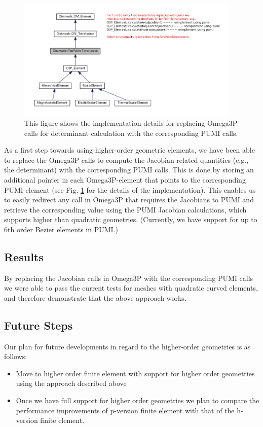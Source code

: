 \documentclass[review,12pt]{elsarticle_summary_report}
\begin{document}
\begin{figure}[!ph]
\centering
\includegraphics[width=0.95\textwidth]{hide_ten_point_tet.png}
\caption{\label{imp} This figure shows the implementation details for replacing Omega3P calls for determinant calculation with the corresponding PUMI calls.}
\end{figure}
As a first step towards using higher-order geometric elements, we have been able to replace the Omega3P calls to compute the Jacobian-related quantities (e.g., the determinant) with the corresponding PUMI calls. This is done by storing an additional pointer in each Omega3P-element that points to the corresponding  PUMI-element (see Fig. \ref{imp} for the details of the implementation).
This enables us to easily redirect any call in Omega3P that requires the Jacobians to PUMI and retrieve the corresponding value using the PUMI Jacobian calculations, which supports higher than quadratic geometries. (Currently, we have support for up to 6th order Bezier elements in PUMI.)

\subsection{Results}
By replacing the Jacobian calls in Omega3P with the corresponding PUMI calls we were able to pass the current tests for meshes with quadratic curved  elements, and therefore demonstrate that the above approach works.

\subsection{\label{high_order_geom_future} Future Steps}
Our plan for future developments in regard to the higher-order geometries is as follows:

\begin{itemize}
  \item Move to higher order finite element with support for higher order geometries using the approach described above
  \item Once we have full support for higher order geometries we plan to compare the performance improvements of p-version finite element with that of the h-version finite element. 
\end{itemize}
\end{document}
